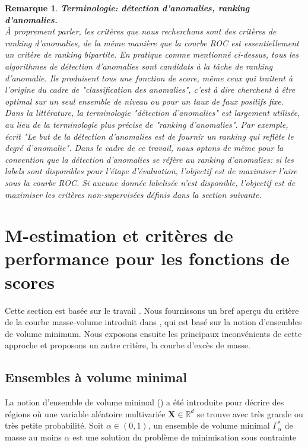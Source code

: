\documentclass[a4paper, 12pt]{article}
\newtheorem{remarque}{Remarque}
\def\mb{\mathbf}
\def\rset{\mathbb{R}}
\begin{document}
\begin{remarque}{\bf Terminologie: détection d'anomalies, ranking d'anomalies.\\}
À proprement parler, les critères que nous recherchons sont des critères de \emph{ranking} d'anomalies, de la même manière que la courbe ROC est essentiellement un critère de \emph{ranking} bipartite.
%
En pratique comme mentionné ci-dessus, tous les algorithmes de détection d'anomalies sont candidats à la tâche de ranking d'anomalie. Ils produisent tous une fonction de score, même ceux qui traitent à l'origine du cadre de "classification des anomalies", c'est à dire cherchent à être optimal sur un seul ensemble de niveau ou pour un taux de faux positifs fixe.
%
Dans la littérature, la terminologie "détection d'anomalies" est largement utilisée, au lieu de la terminologie plus précise de "ranking d'anomalies". Par exemple, \cite{Liu2008} écrit "\emph{Le but de la détection d'anomalies est de fournir un ranking qui reflète le degré d'anomalie}".
%
Dans le cadre de ce travail, nous optons de même pour la convention que la détection d'anomalies se réfère au ranking d'anomalies: si les labels sont disponibles pour l'étape d'évaluation, l'objectif est de maximiser l'aire sous la courbe ROC. Si aucune donnée labelisée n'est disponible, l'objectif est de maximiser les critères non-supervisées définis dans la section suivante.

\end{remarque}


\section{M-estimation et critères de performance pour les fonctions de scores}
\label{resume_fr:scoring}
Cette section est basée sur le travail \cite{AISTAT15}. Nous fournissons un bref aperçu du critère de la courbe masse-volume introduit dans \cite{CLEM13}, qui est basé sur la notion d'ensembles de volume minimum. Nous exposons ensuite les principaux inconvénients de cette approche et proposons un autre critère, la courbe d'excès de masse.

\subsection{Ensembles à volume minimal}
\label{resume_fr:mv-set}

La notion d'ensemble de volume minimal (\cite{Polonik97, Einmahl1992}) a été introduite pour décrire des régions où une variable aléatoire multivariée $\mb X \in \rset^d$  se trouve avec très grande ou très petite probabilité. Soit $\alpha \in (0,1)$, un ensemble de volume minimal $\Gamma^*_{\alpha}$ de masse au moins $\alpha $ est une solution du problème de minimisation sous contrainte
\end{document}
